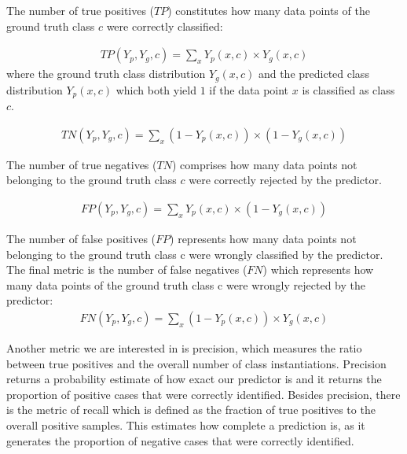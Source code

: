 The number of true positives ($TP$) constitutes how many data points of the ground
truth class $c$ were correctly classified:


\begin{equation}
\begin{split}
TP\left ( Y_{p},Y_{g},c \right )=\sum_{x}^{}Y_{p}\left ( x,c \right )\times Y_{g}\left ( x, c \right )
\label{}
\end{split}
\end{equation}
where the ground truth class distribution $Y_{g} (x, c)$
and the predicted class distribution $Y_{p} (x, c)$ which both yield $1$ if the data point $x$  is classified as class $c$.

\begin{equation}
\begin{split}
TN\left ( Y_{p},Y_{g},c \right )=\sum_{x}^{}\left (1-Y_{p}\left ( x,c \right )  \right )\times \left ( 1-Y_{g}\left ( x,c \right ) \right ) 
\label{}
\end{split}
\end{equation}

The number of true negatives ($TN$) comprises how many data points not belonging to
the ground truth class $c$ were correctly rejected by the predictor.

\begin{equation}
\begin{split}
FP\left ( Y_{p},Y_{g},c \right )=\sum_{x}^{}Y_{p}\left ( x,c \right )\times \left ( 1-Y_{g}\left ( x,c \right ) \right )
\label{}
\end{split}
\end{equation}

The number of false positives ($FP$) represents how many data points not belonging to the ground truth class c were wrongly classified by the predictor.
The final metric is the number of false negatives ($FN$) which represents how many data points of the ground truth class c were wrongly rejected by the predictor:
\begin{equation}
\begin{split}
FN\left ( Y_{p},Y_{g},c \right )=\sum_{x}^{}\left (1-Y_{p}\left ( x,c \right )  \right )\times Y_{g}\left ( x,c \right ) 
\label{}
\end{split}
\end{equation}


Another metric we are interested in is precision, which measures the ratio between true positives and the overall number of class instantiations. Precision returns a probability estimate of how exact our predictor is and it returns the proportion of positive cases that were correctly identified. Besides precision, there is the metric of recall which is defined as the fraction of true positives to the overall positive samples. This estimates how complete a prediction is, as it generates  the proportion of negative cases that were correctly identified.

